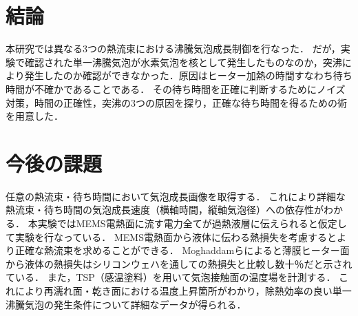 

\section{結論}
本研究では異なる3つの熱流束における沸騰気泡成長制御を行なった．
だが，実験で確認された単一沸騰気泡が水素気泡を核として発生したものなのか，突沸により発生したのか確認ができなかった．原因はヒーター加熱の時間すなわち待ち時間が不確かであることである．
その待ち時間を正確に判断するためにノイズ対策，時間の正確性，突沸の3つの原因を探り，正確な待ち時間を得るための術を用意した．




\section{今後の課題}
任意の熱流束・待ち時間において気泡成長画像を取得する．
これにより詳細な熱流束・待ち時間の気泡成長速度（横軸時間，縦軸気泡径）への依存性がわかる．
本実験ではMEMS電熱面に流す電力全てが過熱液層に伝えられると仮定して実験を行なっている．
MEMS電熱面から液体に伝わる熱損失を考慮するとより正確な熱流束を求めることができる．
Moghaddamら\cite{Moghaddam2006}によると薄膜ヒーター面から液体の熱損失はシリコンウェハを通しての熱損失と比較し数十％だと示されている．
また，TSP（感温塗料）を用いて気泡接触面の温度場を計測する．
これにより再濡れ面・乾き面における温度上昇箇所がわかり，除熱効率の良い単一沸騰気泡の発生条件について詳細なデータが得られる．



